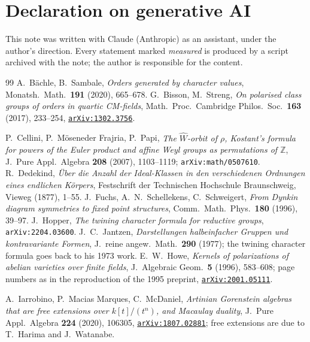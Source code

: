 \documentclass[11pt,a4paper]{article}
\theoremstyle{definition}
\begin{document}
\section*{Declaration on generative AI}
This note was written with Claude (Anthropic) as an assistant, under the author's direction. Every
statement marked \emph{measured} is produced by a script archived with the note; the author is
responsible for the content.

\begin{thebibliography}{99}
 A.~B\"achle, B.~Sambale, \emph{Orders generated by character values},
Monatsh.~Math.~\textbf{191} (2020), 665--678.
 G.~Bisson, M.~Streng, \emph{On polarised class groups of orders in quartic
CM-fields}, Math.~Proc.~Cambridge Philos.~Soc.~\textbf{163} (2017), 233--254,
\href{https://arxiv.org/abs/1302.3756}{\texttt{arXiv:1302.3756}}.

 P.~Cellini, P.~M\"oseneder Frajria, P.~Papi, \emph{The $\widehat W$-orbit of $\rho$,
Kostant's formula for powers of the Euler product and affine Weyl groups as permutations of
$\mathbb{Z}$}, J.~Pure Appl.~Algebra \textbf{208} (2007), 1103--1119;
\texttt{arXiv:math/0507610}.
 R.~Dedekind, \emph{\"Uber die Anzahl der Ideal-Klassen in den verschiedenen Ordnungen
eines endlichen K\"orpers}, Festschrift der Technischen Hochschule Braunschweig, Vieweg (1877),
1--55.
 J.~Fuchs, A.~N.~Schellekens, C.~Schweigert, \emph{From Dynkin diagram symmetries to
fixed point structures}, Comm.~Math.~Phys.~\textbf{180} (1996), 39--97.
 J.~Hopper, \emph{The twining character formula for reductive groups},
\texttt{arXiv:2204.03600}.
 J.~C.~Jantzen, \emph{Darstellungen halbeinfacher Gruppen und kontravariante Formen},
J.~reine angew.~Math.~\textbf{290} (1977); the twining character formula goes back to his 1973 work.
 E.~W.~Howe, \emph{Kernels of polarizations of abelian varieties over finite fields},
J.~Algebraic Geom.~\textbf{5} (1996), 583--608; page numbers as in the reproduction of the 1995
preprint, \href{https://arxiv.org/abs/2001.05111}{\texttt{arXiv:2001.05111}}.

 A.~Iarrobino, P.~Macias Marques, C.~McDaniel, \emph{Artinian Gorenstein algebras that
are free extensions
over $k[t]/(t^n)$, and Macaulay duality}, J.~Pure Appl.~Algebra \textbf{224} (2020), 106305,
\href{https://arxiv.org/abs/1807.02881}{\texttt{arXiv:1807.02881}}; free extensions are due to
T.~Harima and J.~Watanabe.


\end{thebibliography}
\end{document}
